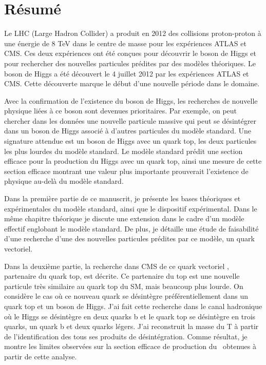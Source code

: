 \begin{otherlanguage}{francais}
\chapter*{R\'{e}sum\'{e}}

Le LHC (Large Hadron Collider) a produit en 2012 des collisions proton-proton à une énergie de 8 TeV  dans le centre de masse pour les expériences ATLAS et CMS. Ces deux expériences ont été conçues pour découvrir le boson de Higgs et pour rechercher des nouvelles particules prédites par des modèles théoriques. Le boson de Higgs a été découvert le 4 juillet 2012 par les expériences ATLAS et CMS. Cette découverte marque le début  d'une nouvelle période dans le domaine. 

Avec la confirmation de l'existence du boson de Higgs, les recherches de nouvelle physique liées à ce boson sont devenues prioritaires. Par exemple, on peut chercher dans les données une nouvelle particule massive qui peut se désintégrer dans un boson de Higgs associé à d'autres particules du modèle standard. Une signature attendue est un boson de Higgs avec un quark top, les deux particules les plus lourdes du modèle standard. Le modèle standard prédit une section efficace pour la production du Higgs avec un quark top, ainsi une mesure de cette section efficace montrant une valeur plus importante prouverait l'existence de physique au-delà du modèle standard.

Dans la première partie de ce manuscrit, je présente les bases théoriques et expérimentales du modèle standard, ainsi que le dispositif expérimental. Dans le même chapitre théorique je discute une extension dans le cadre d'un modèle effectif englobant le modèle standard. De plus, je détaille une étude de faisabilité d'une recherche d'une des nouvelles particules prédites par ce modèle, un quark vectoriel.

Dans la deuxième partie, la recherche dans CMS de ce quark vectoriel \Tp,  partenaire du quark top, est décrite. Ce partenaire du top est une nouvelle particule très similaire au quark top du SM, mais beaucoup plus lourde. On considère le cas où ce nouveau quark se désintègre préférentiellement dans un quark top et un boson de Higgs. J'ai fait cette recherche dans le canal hadronique où le Higgs se désintègre en deux quarks b et le quark top se désintègre en trois quarks, un quark b et deux quarks légers. J'ai reconstruit la masse du T à partir de l'identification des tous ses produits de désintégration. Comme résultat, je montre les limites observées sur la section efficace de production du \Tp~obtenues à partir de cette analyse.
\end{otherlanguage}  

\endgroup